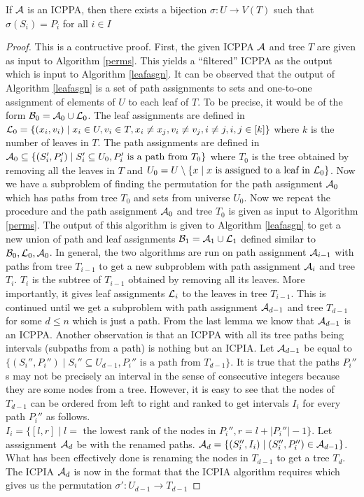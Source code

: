 \documentclass{llncs}
\def\cA{{\cal A}}
\def\cB{{\cal B}}
\def\cL{{\cal L}}
\begin{document}
\begin{theorem}
\label{th:perm}
  If $\cA$ is an ICPPA, then there exists a bijection $\sigma : U
\rightarrow V(T)$ such that $\sigma(S_i) = P_i$ for all $i \in I$
\end{theorem}
\begin{proof}
This is a contructive proof. First, the given ICPPA $\cA$ and tree $T$ are given as input to Algorithm
\ref{perms}. This yields a ``filtered'' ICPPA as the output which is
input to Algorithm \ref{leafasgn}.
It can be observed that the output of Algorithm \ref{leafasgn} is a set of path
assignments to sets and one-to-one assignment of elements of $U$ to
each leaf of $T$. To be precise, it would be of the form $\cB_0 =
\cA_0 \cup \cL_0$. The leaf assignments are defined in $\cL_0
= \{ (x_i,v_i) \mid x_i \in U, v_i \in T, x_i \ne x_j, v_i \ne v_j, i \ne j, i,j \in [k] \}$ where $k$ is the
number of leaves in $T$. The path assignments are defined in $\cA_0
\subseteq \{(S_i',P_i') \mid S_i' \subseteq U_0, P_i' \text{ is a path
  from } T_0\}$ where $T_0$ is the tree obtained by removing all the
leaves in $T$ and $U_0 = U \setminus \{ x \mid x \text{ is assigned to
  a leaf in }\cL_0 \}$. Now we have a subproblem of finding the
permutation for the path assignment $\cA_0$ which has paths from tree
$T_0$ and sets from universe $U_0$. Now we repeat the procedure and the path assignment $\cA_0$ and tree $T_0$
is given as input to Algorithm \ref{perms}. The output of this
algorithm is given to Algorithm \ref{leafasgn} to get a new
union of path and leaf assignments $\cB_1 =
\cA_1 \cup \cL_1$ defined similar to $\cB_0, \cL_0, \cA_0$. In
general, the two algorithms are run on
path assignment $\cA_{i-1}$ with paths from tree $T_{i-1}$ to get a new
subproblem with path assignment $\cA_i$ and tree $T_{i}$. $T_i$ is
the subtree of $T_{i-1}$ obtained by removing all its leaves. More importantly, it gives leaf
assignments $\cL_{i}$ to the leaves in tree $T_{i-1}$. This is
continued until we get a subproblem with path assignment $\cA_{d-1}$ and
tree $T_{d-1}$ for some $d \le n$ which is just a
path. From the last lemma we know that $\cA_{d-1}$ is an
ICPPA. Another observation is that an ICPPA with all its tree paths
being intervals (subpaths from a path) is nothing but an ICPIA\cite{nsnrs09}.
Let $\cA_{d-1}$ be equal to $\{(S_i'',P_i'') \mid S_i'' \subseteq U_{d-1}, P_i'' \text{ is a path
  from } T_{d-1} \}$. It is true that the paths $P_i''$s
may not be precisely an interval in the sense of consecutive integers
because they are some nodes from a tree. However, it is easy to see that
the nodes of $T_{d-1}$ can be ordered from left to right and ranked to get
intervals $I_i$ for every path $P_i''$ as follows. $I_i = \{[l,r]
\mid l = \text{ the lowest rank of the nodes in }P_i'', r = l+|P_i''|-1
\}$. Let asssignment $\cA_d$ be with the renamed paths. $\cA_d = \{ (S_i'', I_i) \mid (S_i'', P_i'') \in \cA_{d-1}
\}$. What has been effectively done is renaming the nodes in $T_{d-1}$
to get a tree $T_d$.
The ICPIA $\cA_d$ is now in the format that the ICPIA algorithm
requires which gives us the permutation $\sigma' : U_{d-1} \rightarrow T_{d-1}$


\end{proof}
\end{document}
